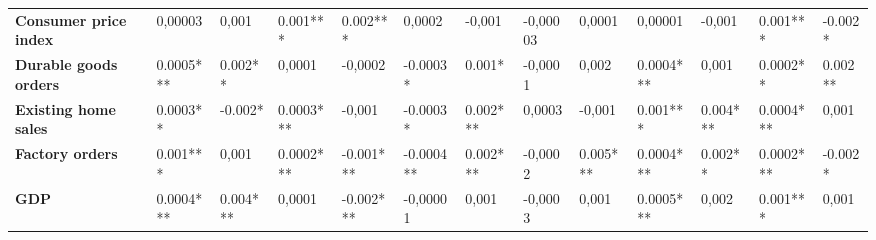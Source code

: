 \begin{landscape}
\begin{table}[]
{\begin{tabular}{@{}lllllllllllll@{}}
\textbf{Consumer price index}     & 0,00003                               & 0,001                                 & 0.001***                              & 0.002***                              & 0,0002                                & -0,001                                & -0,00003                              & 0,0001                                & 0,00001                               & -0,001                                & 0.001***                              & -0.002*                               \\
\textbf{Durable goods orders}     & 0.0005***                             & 0.002**                               & 0,0001                                & -0,0002                               & -0.0003*                              & 0.001*                                & -0,0001                               & 0,002                                 & 0.0004***                             & 0,001                                 & 0.0002**                              & 0.002**                               \\
\textbf{Existing home sales}      & 0.0003**                              & -0.002*                               & 0.0003***                             & -0,001                                & -0.0003*                              & 0.002***                              & 0,0003                                & -0,001                                & 0.001***                              & 0.004***                              & 0.0004***                             & 0,001                                 \\
\textbf{Factory orders}           & 0.001***                              & 0,001                                 & 0.0002***                             & -0.001***                             & -0.0004**                             & 0.002***                              & -0,0002                               & 0.005***                              & 0.0004***                             & 0.002**                               & 0.0002***                             & -0.002*                               \\
\textbf{GDP}                      & 0.0004***                             & 0.004***                              & 0,0001                                & -0.002***                             & -0,00001                              & 0,001                                 & -0,0003                               & 0,001                                 & 0.0005***                             & 0,002                                 & 0.001***                              & 0,001                                 \\

\end{tabular}}
\end{table}
\end{landscape}
